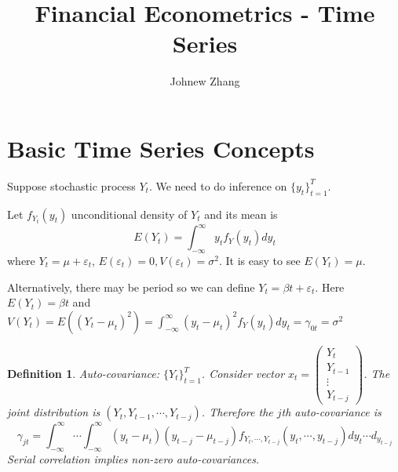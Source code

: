 \documentclass[11pt, a4paper, oneside]{article}
\title{Financial Econometrics - Time Series}
\author{Johnew Zhang}
\newtheorem{mydef}{Definition}
\theoremstyle{definition}
\theoremstyle{proposition}
\theoremstyle{corollary}
\theoremstyle{lemma}
\theoremstyle{theorem}
\begin{document}
 

\def\angl#1{{%
\vbox{\hrule height .2pt 
\kern 1pt 
\hbox{$\scriptstyle {#1}\kern 1pt$}%
}\kern-.05pt \vrule width .2pt 
}} 

\def\tcelife#1{{\buildrel \circ \over e}_{#1}}

\maketitle

\hline

\tableofcontents
\addcontentsline 

\newpage

\section{Basic Time Series Concepts}
Suppose stochastic process $Y_t$. We need to do inference on $\{y_t\}^T_{t=1}$. 

Let $f_{Y_t}(y_t)$ unconditional density of $Y_t$ and its mean is 
$$E(Y_t) = \int_{-\infty}^{\infty} y_tf_Y(y_t)dy_t$$
where $Y_t = \mu +\varepsilon_t$, $E(\varepsilon_t) = 0, V(\varepsilon_t) = \sigma^2$. It is easy to see $E(Y_t) = \mu$. 

Alternatively, there may be period so we can define $Y_t = \beta t + \varepsilon_t$. Here $E(Y_t) = \beta t$ and $V(Y_t) = E((Y_t-\mu_t)^2) = \int_{-\infty}^{\infty}(y_t - \mu_t)^2 f_Y(y_t)dy_t= \gamma_{0t} = \sigma^2$

\begin{mydef}
Auto-covariance: $\{Y_t\}^T_{t=1}$. Consider vector $x_t = \begin{pmatrix} 
Y_t\\ Y_{t-1}\\ \vdots \\ Y_{t-j}
\end{pmatrix}$. The joint distribution is $(Y_t, Y_{t-1}, \cdots, Y_{t-j})$. Therefore the $j$th auto-covariance is $$\gamma_{jt} = \int_{-\infty}^{\infty}\cdots\int_{-\infty}^{\infty}(y_t-\mu_t)(y_{t-j} - \mu_{t-j})f_{Y_t,\cdots, Y_{t-j}}(y_t, \cdots, y_{t-j})dy_t\cdots d_y_{t-j}$$
Serial correlation implies non-zero auto-covariances. 
\end{mydef}
\end{document}
